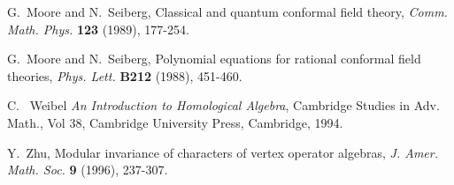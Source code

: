 \documentclass[12pt]{article}
\begin{document}
\begin{thebibliography}{FGST2}
 G.~Moore and N.~Seiberg, Classical and quantum conformal
field theory, {\em Comm. Math. Phys.} {\bf 123} (1989), 177-254.

 G.~Moore and N.~Seiberg, Polynomial equations for rational
conformal field theories, {\em Phys. Lett.} {\bf B212} (1988), 451-460.

 C. ~Weibel {\em An Introduction to Homological Algebra},
Cambridge Studies in Adv. Math., Vol 38, Cambridge University Press,
Cambridge, 1994.

 Y.~Zhu, Modular invariance of characters of vertex
operator algebras, {\em J. Amer. Math. Soc.} {\bf 9} (1996), 237-307.


\end{thebibliography}
\end{document}
